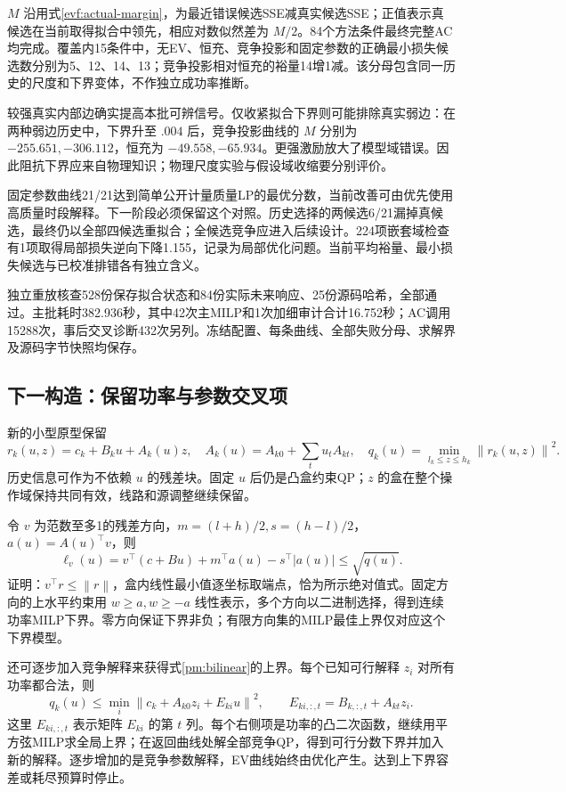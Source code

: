 \documentclass[UTF8,fontset=fandol,11pt,a4paper]{ctexart}
\newcommand{\norm}[1]{\left\lVert#1\right\rVert}
\begin{document}
$M$ 沿用式\eqref{evf:actual-margin}，为最近错误候选SSE减真实候选SSE；正值表示真候选在当前取得拟合中领先，相应对数似然差为 $M/2$。84个方法条件最终完整AC均完成。覆盖内15条件中，无EV、恒充、竞争投影和固定参数的正确最小损失候选数分别为5、12、14、13；竞争投影相对恒充的裕量14增1减。该分母包含同一历史的尺度和下界变体，不作独立成功率推断。

较强真实内部边确实提高本批可辨信号。仅收紧拟合下界则可能排除真实弱边：在两种弱边历史中，下界升至 $.004$ 后，竞争投影曲线的 $M$ 分别为 $-255.651,-306.112$，恒充为 $-49.558,-65.934$。更强激励放大了模型域错误。因此阻抗下界应来自物理知识；物理尺度实验与假设域收缩要分别评价。

固定参数曲线21/21达到简单公开计量质量LP的最优分数，当前改善可由优先使用高质量时段解释。下一阶段必须保留这个对照。历史选择的两候选6/21漏掉真候选，最终仍以全部四候选重拟合；全候选竞争应进入后续设计。224项嵌套域检查有1项取得局部损失逆向下降1.155，记录为局部优化问题。当前平均裕量、最小损失候选与已校准排错各有独立含义。

独立重放核查528份保存拟合状态和84份实际未来响应、25份源码哈希，全部通过。主批耗时382.936秒，其中42次主MILP和1次加细审计合计16.752秒；AC调用15288次，事后交叉诊断432次另列。冻结配置、每条曲线、全部失败分母、求解界及源码字节快照均保存。

\subsection{下一构造：保留功率与参数交叉项}
新的小型原型保留
\begin{equation}
 r_k(u,z)=c_k+B_ku+A_k(u)z,\quad
 A_k(u)=A_{k0}+\sum_tu_tA_{kt},\quad
 q_k(u)=\min_{l_k\le z\le h_k}\norm{r_k(u,z)}^2.
 \label{pm:bilinear}
\end{equation}
历史信息可作为不依赖 $u$ 的残差块。固定 $u$ 后仍是凸盒约束QP；$z$ 的盒在整个操作域保持共同有效，线路和源调整继续保留。

令 $v$ 为范数至多1的残差方向，$m=(l+h)/2,s=(h-l)/2$，$a(u)=A(u)^\top v$，则
\begin{equation}
 \ell_v(u)=v^\top(c+Bu)+m^\top a(u)-s^\top|a(u)|
 \le\sqrt{q(u)}.
 \label{pm:support}
\end{equation}
证明：$v^\top r\le\norm r$，盒内线性最小值逐坐标取端点，恰为所示绝对值式。固定方向的上水平约束用 $w\ge a,w\ge-a$ 线性表示，多个方向以二进制选择，得到连续功率MILP下界。零方向保证下界非负；有限方向集的MILP最佳上界仅对应这个下界模型。

还可逐步加入竞争解释来获得式\eqref{pm:bilinear}的上界。每个已知可行解释 $z_i$ 对所有功率都合法，则
\begin{equation}
 q_k(u)\le\min_i\norm{c_k+A_{k0}z_i+E_{ki}u}^2,
 \qquad E_{ki,:,t}=B_{k,:,t}+A_{kt}z_i.
 \label{pm:witness}
\end{equation}
这里 $E_{ki,:,t}$ 表示矩阵 $E_{ki}$ 的第 $t$ 列。每个右侧项是功率的凸二次函数，继续用平方弦MILP求全局上界；在返回曲线处解全部竞争QP，得到可行分数下界并加入新的解释。逐步增加的是竞争参数解释，EV曲线始终由优化产生。达到上下界容差或耗尽预算时停止。
\end{document}
